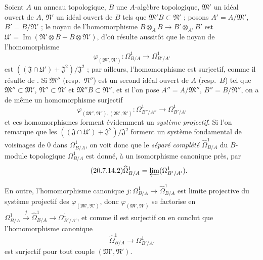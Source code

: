 \begin{env}[20.7.14]
\label{0.20.7.14-fr}
Soient $A$ un anneau topologique, $B$ une $A$-algèbre topologique,
$\mathfrak{M}'$ un idéal ouvert de $A$, $\mathfrak{N}'$ un idéal ouvert de
$B$ tels que $\mathfrak{M}'B\subset\mathfrak{N}'$ ; posons
$A'=A/\mathfrak{M}'$,
$B'=B/\mathfrak{N}'$ ; le noyau de l'homomorphisme
$B\otimes_A B\to B'\otimes_{A'}B'$ est
$\mathfrak{U}'=\operatorname{Im}(\mathfrak{N}'\otimes B+B\otimes\mathfrak{N}')$,
d'où résulte aussitôt que le noyau de l'homomorphisme
\begin{equation}
\tag{20.7.14.1}
\label{0.20.7.14.1-fr}
  \varphi_{(\mathfrak{M}',\mathfrak{N}')}:
  \Omega^1_{B/A}\to\Omega^1_{B'/A'}
\end{equation}
est $((\mathfrak{J}\cap\mathfrak{U}')+\mathfrak{J}^2)/\mathfrak{J}^2$ ; par
ailleurs, l'homomorphisme  est surjectif, comme il
résulte de . Si $\mathfrak{M}''$ (resp.\
$\mathfrak{N}''$) est un second idéal ouvert de $A$ (resp.\ $B$) tel que
$\mathfrak{M}''\subset\mathfrak{M}'$, $\mathfrak{N}''\subset\mathfrak{N}'$
et $\mathfrak{M}''B\subset\mathfrak{N}''$, et si l'on pose
$A''=A/\mathfrak{M}''$, $B''=B/\mathfrak{N}''$, on a de même un
homomorphisme surjectif
\[
  \varphi_{(\mathfrak{M}'',\mathfrak{N}''),(\mathfrak{M}',\mathfrak{N}')}:
  \Omega^1_{B''/A''}\to\Omega^1_{B'/A'}
\]
et ces homomorphismes forment évidemment un \emph{système projectif}. Si
l'on remarque que les
$((\mathfrak{J}\cap\mathfrak{U}')+\mathfrak{J}^2)/\mathfrak{J}^2$ forment
un système fondamental de voisinages de $0$ dans $\Omega^1_{B/A}$, on voit
donc que le \emph{séparé complété} $\widehat{\Omega}^1_{B/A}$ du $B$-module
topologique $\Omega^1_{B/A}$ est donné, à un isomorphisme canonique près, par
\begin{equation}
\tag{20.7.14.2}
\label{0.20.7.14.2-fr}
  \widehat{\Omega}^1_{B/A}=\varprojlim(\Omega^1_{B'/A'}).
\end{equation}

En outre, l'homomorphisme canonique
$j:\Omega^1_{B/A}\to\widehat{\Omega}^1_{B/A}$ est limite projective du
système projectif des $\varphi_{(\mathfrak{M}',\mathfrak{N}')}$, donc
$\varphi_{(\mathfrak{M}',\mathfrak{N}')}$ se factorise en
$\Omega^1_{B/A}\xrightarrow{j}\widehat{\Omega}^1_{B/A}\to
\Omega^1_{B'/A'}$, et comme il est surjectif on en conclut que
l'homomorphisme canonique
\begin{equation}
\tag{20.7.14.3}
\label{0.20.7.14.3-fr}
  \widehat{\Omega}^1_{B/A}\to\Omega^1_{B'/A'}
\end{equation}
est surjectif pour tout couple $(\mathfrak{M}',\mathfrak{N}')$.


\end{env}

